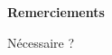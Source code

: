 \chapter*{}
\minitoc
\setcounter{minitocdepth}{0}

\hspace{4cm} \textbf{\Huge Remerciements}

\vspace{1cm}

Nécessaire ?

\vspace{2cm}
